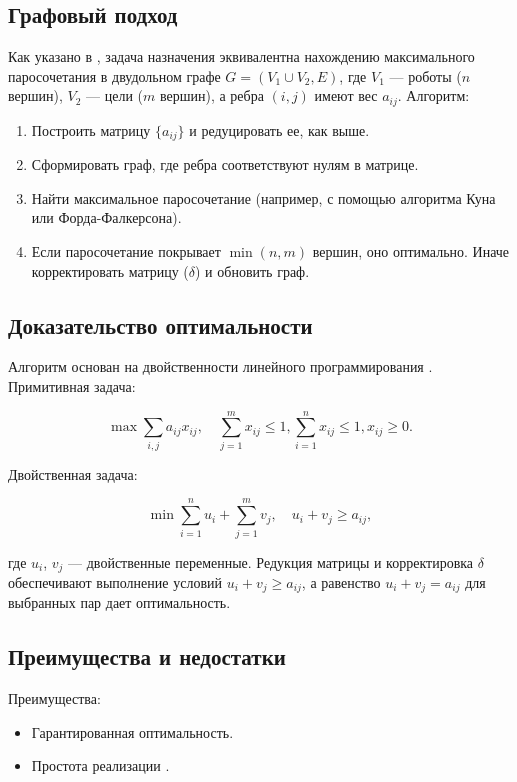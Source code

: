 \subsection{Графовый подход}
Как указано в \cite{emaxx2025}, задача назначения эквивалентна нахождению максимального паросочетания в двудольном графе \( G = (V_1 \cup V_2, E) \), где \( V_1 \) --- роботы (\( n \) вершин), \( V_2 \) --- цели (\( m \) вершин), а ребра \( (i,j) \) имеют вес \( a_{ij} \). Алгоритм:

\begin{enumerate}
    \item Построить матрицу \( \{a_{ij}\} \) и редуцировать ее, как выше.
    \item Сформировать граф, где ребра соответствуют нулям в матрице.
    \item Найти максимальное паросочетание (например, с помощью алгоритма Куна или Форда-Фалкерсона).
    \item Если паросочетание покрывает \( \min(n, m) \) вершин, оно оптимально. Иначе корректировать матрицу (\( \delta \)) и обновить граф.
\end{enumerate}

\subsection{Доказательство оптимальности}
Алгоритм основан на двойственности линейного программирования \cite{kuhn1955}. Примитивная задача:

\[
\max \sum_{i,j} a_{ij} x_{ij}, \quad \sum_{j=1}^m x_{ij} \leq 1, \sum_{i=1}^n x_{ij} \leq 1, x_{ij} \geq 0.
\]

Двойственная задача:

\[
\min \sum_{i=1}^n u_i + \sum_{j=1}^m v_j, \quad u_i + v_j \geq a_{ij},
\]

где \( u_i \), \( v_j \) --- двойственные переменные. Редукция матрицы и корректировка \( \delta \) обеспечивают выполнение условий \( u_i + v_j \geq a_{ij} \), а равенство \( u_i + v_j = a_{ij} \) для выбранных пар дает оптимальность.

\subsection{Преимущества и недостатки}
Преимущества:
\begin{itemize}
    \item Гарантированная оптимальность.
    \item Простота реализации \cite{emaxx2025}.
\end{itemize}


